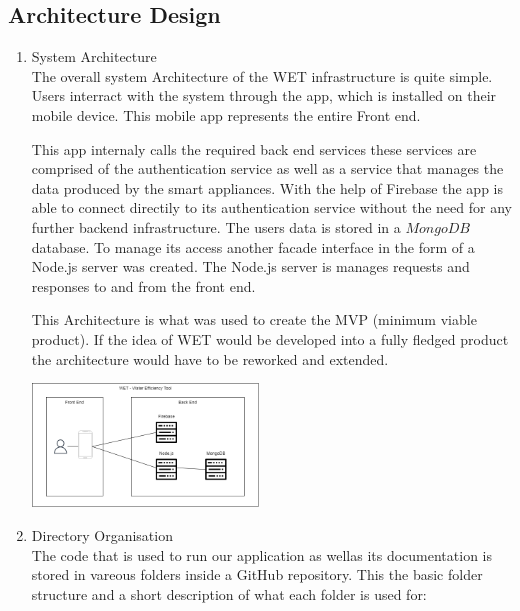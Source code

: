 \documentclass[10pt]{article}
\begin{document}
\begin{multicols*}{2}
\clearpage

\section{Architecture Design}

\begin{enumerate}
  \item {System Architecture} \\
  The overall system Architecture of the WET infrastructure is quite simple.
  Users interract with the system through the app, which is installed on their mobile device. This mobile app represents the entire Front end.

  This app internaly calls the required back end services these services are comprised of the authentication service as well as a service that manages the data produced by the smart appliances.
  With the help of Firebase the app is able to connect directily to its authentication service without the need for any further backend infrastructure.
  The users data is stored in a $MongoDB$ database. To manage its access another facade interface in the form of a Node.js server was created. The Node.js server is manages requests and responses to and from the front end.

  This Architecture is what was used to create the MVP (minimum viable product). If the idea of WET would be developed into a fully fledged product the architecture would have to be reworked and extended.

  \begin{center}
    \includegraphics[max width=6cm]{uml/architecture}
  \end{center}
  
  \item {Directory Organisation} \\
  The code that is used to run our application as wellas its documentation is stored in vareous folders inside a GitHub repository.
  This the basic folder structure and a short description of what each folder is used for:


\end{enumerate}
\end{multicols*}
\end{document}
